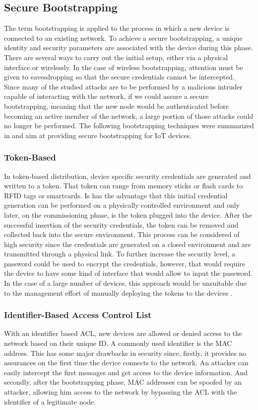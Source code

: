 \documentclass{sig-alternate-05-2015}
\begin{document}
\subsection{Secure Bootstrapping}
\label{sec:secure_bootstrapping}
The term bootstrapping is applied to the process in which a new device is connected to an existing network. To achieve a secure bootstrapping, a unique identity and security parameters are associated with the device during this phase. There are several ways to carry out the initial setup, either via a physical interface or wirelessly. In the case of wireless bootstrapping, attention must be given to eavesdropping so that the secure credentials cannot be intercepted.\\
Since many of the studied attacks are to be performed by a malicious intruder capable of interacting with the network, if we could assure a secure bootstrapping, meaning that the new node would be authenticated before becoming an active member of the network, a large portion of those attacks could no longer be performed. The following bootstrapping techniques were summarized in \cite{Fischer2012} and aim at providing secure bootstrapping for \gls{IoT} devices.

\subsubsection{Token-Based}
In token-based distribution, device specific security credentials are generated and written to a token. That token can range from memory sticks or flash cards to \gls{RFID} tags or smartcards. Is has the advantage that this initial credential generation can be performed on a physically controlled environment and only later, on the commissioning phase, is the token plugged into the device. After the successful insertion of the security credentials, the token can be removed and collected back into the secure environment. This process can be considered of high security since the credentials are generated on a closed environment and are transmitted through a physical link. To further increase the security level, a password could be used to encrypt the credentials, however, that would require the device to have some kind of interface that would allow to input the password. In the case of a large number of devices, this approach would be unsuitable due to the management effort of manually deploying the tokens to the devices \cite{Fischer2012}.

\subsubsection{Identifier-Based Access Control List}
With an identifier based \gls{ACL}, new devices are allowed or denied access to the network based on their unique ID. A commonly used identifier is the MAC address. This has some major drawbacks in security since, firstly, it provides no assurances on the first time the device connects to the network. An attacker can easily intercept the first messages and get access to the device information. And secondly, after the bootstrapping phase, MAC addresses can be spoofed by an attacker, allowing him access to the network by bypassing the \gls{ACL} with the identifier of a legitimate node.
\end{document}
